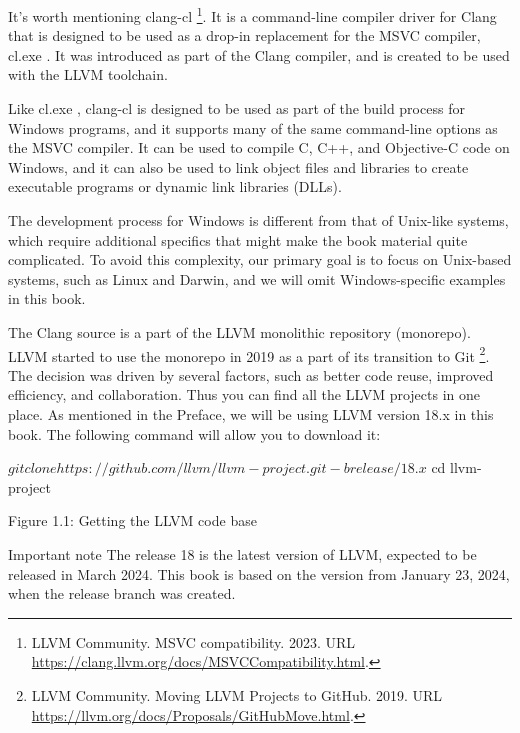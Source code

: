It's worth mentioning clang-cl \footnote{LLVM Community. MSVC compatibility. 2023. URL \url{https://clang.llvm.org/docs/MSVCCompatibility.html}.}. It is a command-line compiler driver for Clang that is designed to be used as a drop-in replacement for the MSVC compiler, cl.exe . It was introduced as part of the Clang compiler, and is created to be used with the LLVM toolchain.

Like cl.exe , clang-cl is designed to be used as part of the build process for Windows programs, and it supports many of the same command-line options as the MSVC compiler. It can be used to compile C, C++, and Objective-C code on Windows, and it can also be used to link object files and libraries to create executable programs or dynamic link libraries (DLLs).

The development process for Windows is different from that of Unix-like systems, which require additional specifics that might make the book material quite complicated. To avoid this complexity, our primary goal is to focus on Unix-based systems, such as Linux and Darwin, and we will omit Windows-specific examples in this book.




The Clang source is a part of the LLVM monolithic repository (monorepo). LLVM started to use the monorepo in 2019 as a part of its transition to Git \footnote{LLVM Community. Moving LLVM Projects to GitHub. 2019. URL \url{https://llvm.org/docs/Proposals/GitHubMove.html}.}. The decision was driven by several factors, such as better code reuse, improved efficiency, and collaboration. Thus you can find all the LLVM projects in one place. As mentioned in the Preface, we will be using LLVM version 18.x in this book. The following command will allow you to download it:

\begin{shell}
$ git clone https://github.com/llvm/llvm-project.git -b release/18.x
$ cd llvm-project
\end{shell}

\begin{center}
Figure 1.1: Getting the LLVM code base
\end{center}


\begin{myNotic}{Important note}
The release 18 is the latest version of LLVM, expected to be released in March 2024. This book is based on the version from January 23, 2024, when the release branch was created.
\end{myNotic}


